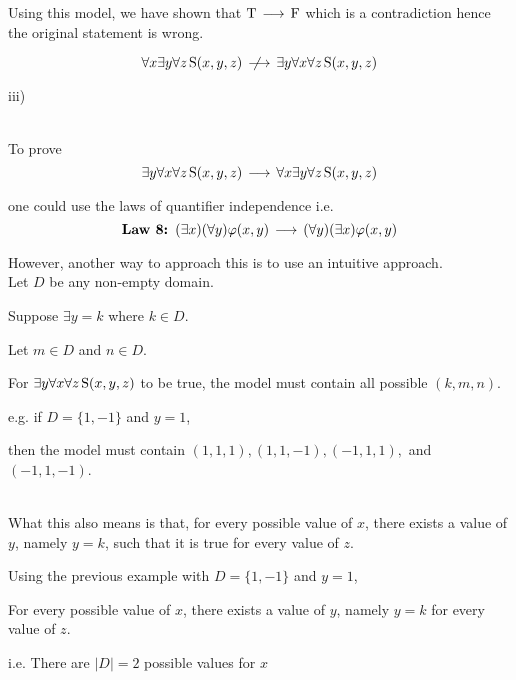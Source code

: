 \documentclass{article}
\newcommand{\True}{\textnormal{T}}
\newcommand{\False}{\textnormal{F}}
\newcommand{\predS}{\hspace{0.05cm} \textnormal{S}}
\newcommand{\predicate}{\predS (x,y,z)}
\newcommand{\impgap}{\hspace{0.05cm}}
\newcommand{\imp}{\impgap \longrightarrow \impgap}
\newcommand{\notimplies}{%
  \mathrel{{\ooalign{\hidewidth$\not\phantom{=}$\hidewidth\cr$\imp$}}}}
\begin{document}
\begin{enumerate}
{    Using this model, we have shown that $\True \imp \False$ which is a contradiction hence the original statement is wrong.
    
    $$\forall x \exists y \forall z \predicate \notimplies \exists y \forall x \forall z \predicate$$
    }
    \pagebreak

    iii) \\ \\
    {
    To prove
    $$\exists y \forall x \forall z \predicate \imp \forall x \exists y \forall z \predicate$$

    one could use the laws of quantifier independence i.e.
    $$\textbf{Law 8: }(\exists x)(\forall y) \varphi(x,y) \imp (\forall y)(\exists x) \varphi(x,y)$$ 
    \begin{flushright}
        \autocite{hammond}
    \end{flushright}
    }
    {
    However, another way to approach this is to use an intuitive approach. \\

    Let $D$ be any non-empty domain.
    
    Suppose $\exists y=k$ where $k \in D$.
    
    Let $m \in D$ and $n \in D$.

    For $\exists y \forall x \forall z \predicate$ to be true, the model must contain all possible $(k,m,n)$. \\

    {
    \hspace{0.5cm} e.g. if $D = \{1, -1\}$ and $y=1$,
    
    \hspace{0.5cm} then the model must contain $(1, 1, 1), (1, 1, -1), (-1, 1, 1),$ and $(-1, 1, -1)$.
    } \\

    What this also means is that, for every possible value of $x$, there exists a value of $y$, namely $y=k$, such that it is true for every value of $z$. \\

    {
    \hspace{0.5cm} Using the previous example with $D = \{1, -1\}$ and $y=1$,
    
    \hspace{0.5cm} For every possible value of $x$, there exists a value of $y$, namely $y=k$ for every value of $z$.

    \hspace{0.5cm} i.e. There are $|D| = 2$ possible values for $x$
    
}}
\end{enumerate}
\end{document}
